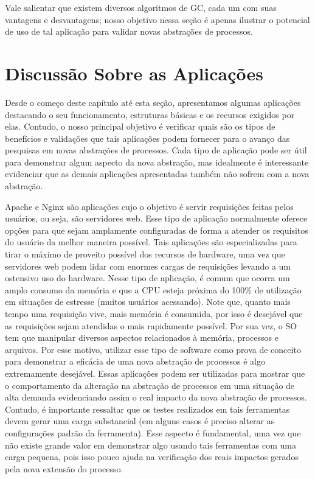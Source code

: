 Vale salientar que existem diversos algoritmos de GC, cada um com suas
vantagens e desvantagens; nosso objetivo nessa seção é apenas ilustrar o
potencial de uso de tal aplicação para validar novas abstrações de processos.

\section{Discussão Sobre as Aplicações}
\label{sec:disc_app}

Desde o começo deste capítulo até esta seção, apresentamos algumas aplicações
destacando o seu funcionamento, estruturas básicas e os recursos exigidos por
elas. Contudo, o nosso principal objetivo é verificar quais são os tipos de benefícios
e validações que tais aplicações podem fornecer para o avanço das pesquisas em
novas abstrações de processos. Cada tipo de aplicação pode ser útil para
demonstrar algum aspecto da nova abstração, mas idealmente é interessante
evidenciar que as demais aplicações apresentadas também não sofrem com a nova
abstração.

Apache e Nginx são aplicações cujo o objetivo é servir requisições feitas pelos
usuários, ou seja, são servidores web. Esse tipo de aplicação normalmente
oferece opções para que sejam amplamente configuradas de forma a atender os
requisitos do usuário da melhor maneira possível. Tais aplicações são
especializadas para tirar o máximo de proveito possível dos recursos de
hardware, uma vez que servidores web podem lidar com enormes cargas de
requisições levando a um ostensivo uso do hardware. Nesse tipo de aplicação, é
comum que ocorra um amplo consumo da memória e que a CPU esteja próxima do
100\% de utilização em situações de estresse (muitos usuários acessando).  Note
que, quanto mais tempo uma requisição vive, mais memória é consumida, por isso
é desejável que as requisições sejam atendidas o mais rapidamente possível. Por
sua vez, o SO tem que manipular diversos aspectos relacionados à memória,
processos e arquivos. Por esse motivo, utilizar esse tipo de software como
prova de conceito para demonstrar a eficácia de uma nova abstração de processos
é algo extremamente desejável. Essas aplicações podem ser utilizadas para
mostrar que o comportamento da alteração na abstração de processos em uma
situação de alta demanda evidenciando assim o real impacto da nova abstração de
processos. Contudo, é importante ressaltar que os testes realizados em tais
ferramentas devem gerar uma carga substancial (em alguns casos é preciso
alterar as configurações padrão da ferramenta). Esse aspecto é fundamental, uma
vez que não existe grande valor em demonstrar algo usando tais ferramentas com
uma carga pequena, pois isso pouco ajuda na verificação dos reais impactos
gerados pela nova extensão do processo.

